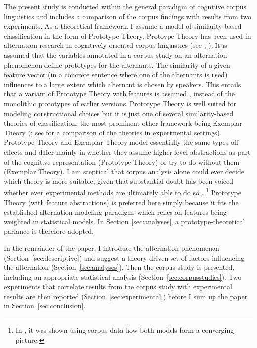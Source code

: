 \documentclass[USenglish]{article}
\begin{document}
The present study is conducted within the general paradigm of cognitive corpus linguistics and includes a comparison of the corpus findings with results from two experiments.
As a theoretical framework, I assume a model of similarity-based classification in the form of Prototype Theory.
Protoype Theory has been used in alternation research in cognitively oriented corpus linguistics (see \citealp{DivjakArppe2013}, \citealp{Gries2003}).
It is assumed that the variables annotated in a corpus study on an alternation phenomenon define prototypes for the alternants.
The similarity of a given feature vector (in a concrete sentence where one of the alternants is used) influences to a large extent which alternant is chosen by speakers.
This entails that a variant of Prototype Theory with features is assumed \citep{Rosch1978}, instead of the monolithic prototypes of earlier versions.
Prototype Theory is well suited for modeling constructional choices but it is just one of several similarity-based theories of classification, the most prominent other framework being Exemplar Theory (\citealp{MedinSchaffer1978,Hintzman1986}; see \citealp{StormsEa2000} for a comparison of the theories in experimental settings).
Prototype Theory and Exemplar Theory model essentially the same types off effects and differ mainly in whether they assume higher-level abstractions as part of the cognitive representation (Prototype Theory) or try to do without them (Exemplar Theory).
I am sceptical that corpus analysis alone could ever decide which theory is more suitable, given that substantial doubt has been voiced whether even experimental methods are ultimately able to do so \citep{Barsalou1990}.%
\footnote{In \cite{DivjakArppe2013}, it was shown using corpus data how both models form a converging picture.}
Prototype Theory (with feature abstractions) is preferred here simply because it fits the established alternation modeling paradigm, which relies on features being weighted in statistical models.
In Section~\ref{sec:analyses}, a prototype-theoretical parlance is therefore adopted.

In the remainder of the paper, I introduce the alternation phenomenon (Section~\ref{sec:descriptive}) and suggest a theory-driven set of factors influencing the alternation (Section~\ref{sec:analyses}).
Then the corpus study is presented, including an appropriate statistical analysis (Section~\ref{sec:corpusstudies}).
Two experiments that correlate results from the corpus study with experimental results are then reported (Section~\ref{sec:experimental}) before I sum up the paper in Section~\ref{sec:conclusion}.
\end{document}

